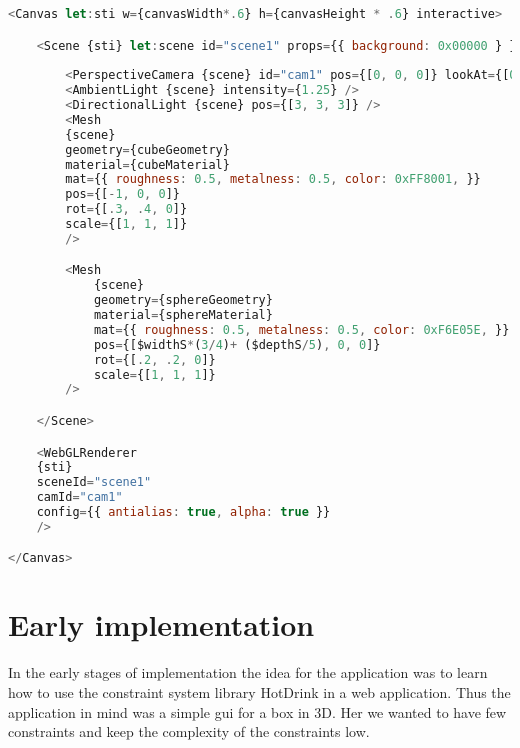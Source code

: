 \begin{lstlisting}[caption={Example of a SveltThree setup},label=sveltthreesetup, language=javascript]
<Canvas let:sti w={canvasWidth*.6} h={canvasHeight * .6} interactive>

    <Scene {sti} let:scene id="scene1" props={{ background: 0x00000 } } >
        
        <PerspectiveCamera {scene} id="cam1" pos={[0, 0, 0]} lookAt={[0, 0, 0]} />
        <AmbientLight {scene} intensity={1.25} />
        <DirectionalLight {scene} pos={[3, 3, 3]} />
        <Mesh
        {scene}
        geometry={cubeGeometry}
        material={cubeMaterial}
        mat={{ roughness: 0.5, metalness: 0.5, color: 0xFF8001, }}
        pos={[-1, 0, 0]}
        rot={[.3, .4, 0]}
        scale={[1, 1, 1]} 
        />

        <Mesh
            {scene}
            geometry={sphereGeometry}
            material={sphereMaterial}
            mat={{ roughness: 0.5, metalness: 0.5, color: 0xF6E05E, }}
            pos={[$widthS*(3/4)+ ($depthS/5), 0, 0]}
            rot={[.2, .2, 0]}
            scale={[1, 1, 1]} 
        />

    </Scene>

    <WebGLRenderer
    {sti}
    sceneId="scene1"
    camId="cam1"
    config={{ antialias: true, alpha: true }} 
    />

</Canvas>
\end{lstlisting}

































\section{Early implementation}

In the early stages of implementation the idea for the application was to learn how 
to use the constraint system library HotDrink in a web application. Thus the 
application in mind was a simple \gls{gui} for a box in 3D. Her we wanted to have few 
constraints and keep the complexity of the constraints low. 

